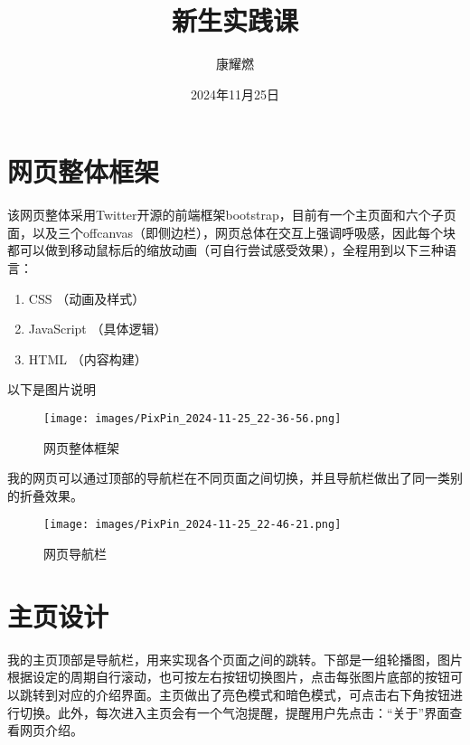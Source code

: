 \documentclass[supercite]{Experimental_Report}
\title{~~~~~~新生实践课~~~~~~}
\author{康耀燃}
\date{2024年11月25日}
\theoremstyle{definition}
\begin{document}
\maketitle

\clearpage


\tableofcontents[level=2]
\clearpage


\section{网页整体框架}
该网页整体采用Twitter开源的前端框架bootstrap，目前有一个主页面和六个子页面，以及三个offcanvas（即侧边栏），网页总体在交互上强调呼吸感，因此每个块都可以做到移动鼠标后的缩放动画（可自行尝试感受效果），全程用到以下三种语言：

\begin{enumerate}
\renewcommand{\labelenumi}{\theenumi)}
	\item CSS    （动画及样式）
	\item JavaScript    （具体逻辑）
	\item HTML    （内容构建）
\end{enumerate}

以下是图片说明

\begin{figure}[htb] %
	\begin{center}
		\texttt{[image: images/PixPin\_2024-11-25\_22-36-56.png]}
		\caption{网页整体框架}
		\label{fig1-1}
	\end{center}
\end{figure}

我的网页可以通过顶部的导航栏在不同页面之间切换，并且导航栏做出了同一类别的折叠效果。

\begin{figure}[htb]
	\begin{center}
		\texttt{[image: images/PixPin\_2024-11-25\_22-46-21.png]}
		\caption{网页导航栏}
		\label{fig1-2}
	\end{center}
\end{figure}

\newpage

\section{主页设计}

我的主页顶部是导航栏，用来实现各个页面之间的跳转。下部是一组轮播图，图片根据设定的周期自行滚动，也可按左右按钮切换图片，点击每张图片底部的按钮可以跳转到对应的介绍界面。主页做出了亮色模式和暗色模式，可点击右下角按钮进行切换。此外，每次进入主页会有一个气泡提醒，提醒用户先点击：“关于”界面查看网页介绍。
\end{document}
